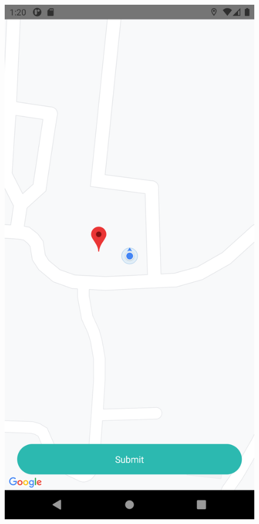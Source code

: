 \documentclass[12pt]{article}
\begin{document}
        \begin{figure}
            \centering
            \begin{minipage}{.5\textwidth}
                \centering
                \includegraphics[scale=0.1]{app_home}

\end{minipage}
\end{figure}
\end{document}
